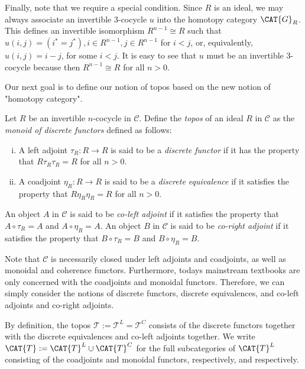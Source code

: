 \documentclass[a4paper,reqno,oneside]{article}
\begin{document}
Finally, note that we require a special condition. Since $R$ is an ideal, we may 
always associate an invertible 3-cocycle $u$ into the homotopy category $\CAT{G}_R$. 
This defines an invertible isomorphism $R^{n-1} \cong R$ such that
$u(i,j) = (i^{*} = j^{*}), i \in R^{n-1}, j \in R^{n-1}$ for $i < j$, or, equivalently,
$u(i,j) = i - j$, for some $i < j$. It is easy to see that $u$ must be an 
invertible 3-cocycle because then $R^{n-1} \cong R$ for all $n > 0$. 

Our next goal is to define our notion of topos based on the new notion of
"homotopy category".

\begin{definition}\label{defn.htp}
Let $R$ be an invertible $n$-cocycle in $\mathcal{C}$. Define the \emph{topos} of 
an ideal $R$ in $\mathcal{C}$ as the \emph{monoid of discrete functors} 
defined as follows:
\begin{enumerate}[(i)]
\item A left adjoint $\tau_R : R \rightarrow R$ is said to be a \emph{discrete functor} if it has the property that $R \tau_R \tau_R = R$ for all $n > 0$.
\item A coadjoint $\eta_R : R \rightarrow R$ is said to be a \emph{discrete equivalence} if it satisfies the property that $R \eta_R \eta_R = R$ for all $n > 0$.
\end{enumerate}
An object $A$ in $\mathcal{C}$ is said to be \emph{co-left adjoint} if it 
satisfies the property that $A \circ \tau_R = A$ and $A \circ \eta_R = A$.
An object $B$ in $\mathcal{C}$ is said to be \emph{co-right adjoint} if it
satisfies the property that $B \circ \tau_R = B$ and $B \circ \eta_R = B$.
\end{definition}

Note that $\mathcal{C}$ is necessarily closed under left adjoints and coadjoints, 
as well as monoidal and coherence functors. Furthermore, todays mainstream textbooks 
are only concerned with the coadjoints and monoidal functors. Therefore, we can simply 
consider the notions of discrete functors, discrete equivalences, and co-left adjoints 
and co-right adjoints. 

By definition, the topos $\mathcal{T} := \mathcal{T}^L = \mathcal{T}^C$ consists of the discrete 
functors together with the discrete equivalences and co-left adjoints together.
We write $\CAT{T} := \CAT{T}^L \cup \CAT{T}^C$ for the full subcategories of $\CAT{T}^L$ 
consisting of the coadjoints and monoidal functors, respectively, and 
respectively. 
\end{document}
